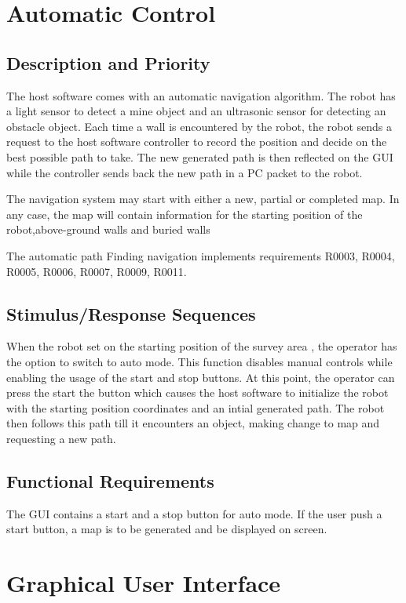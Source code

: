 \documentclass[11pt, a4paper]{report}
\begin{document}

\section {Automatic Control}
\subsection {Description and Priority}
The host software comes with an automatic navigation algorithm. The robot has a light sensor to detect a mine
object and an ultrasonic sensor for detecting an obstacle object. Each time a wall is encountered by
the robot, the robot sends a request to the host software controller to record the position and decide on the best possible path to take. 
The new generated path is then reflected on the GUI while the controller sends back the new path in a PC packet to the robot.

The navigation system may start with either a new, partial or completed map. In any case, the map
will contain information for the starting position of the robot,above-ground walls and buried walls

The automatic path Finding navigation implements requirements  R0003, R0004, R0005, R0006,
R0007, R0009, R0011.
\subsection {Stimulus/Response Sequences}

When the robot set on the starting position of the survey area , the operator has the option to switch to auto
mode. This function disables manual controls while enabling the usage of the start and stop buttons.
At this point, the operator can press the start the button which causes the host software to initialize the
robot with the starting position coordinates and an intial generated path. The robot then follows this
path till it encounters an object, making change to map and requesting a new path.

\subsection {Functional Requirements}

The GUI contains a start and a stop button for auto mode. If the user push a start button, a map is to be generated and be displayed on screen.


\section{Graphical User Interface}
\end{document}
